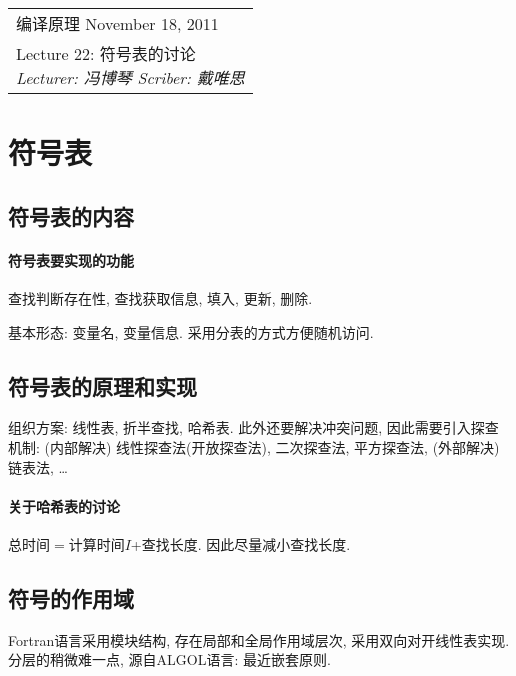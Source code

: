\def\lecture{22}
\clearpage \noindent\begin{tabularx}{\linewidth}{|X|}
\hline \vskip -2mm
{\sf 编译原理} \hfill November 18, 2011 \\
{\centering \sf \large Lecture \lecture:
符号表的讨论 \\ }
\textsl{Lecturer: 冯博琴 \hfill Scriber: 戴唯思}\\ \hline
\end{tabularx}
\setcounter{section}{0}
\renewcommand{\thepage}{\lecture -\arabic{page}}

\section{符号表}

    \subsection{符号表的内容}

        \paragraph{符号表要实现的功能} 查找判断存在性, 查找获取信息, 填入, 更新, 删除.

        基本形态: 变量名, 变量信息. 采用分表的方式方便随机访问.

    \subsection{符号表的原理和实现}

        组织方案: 线性表, 折半查找, 哈希表. 此外还要解决冲突问题, 因此需要引入探查机制: (内部解决) 线性探查法(开放探查法), 二次探查法, 平方探查法, (外部解决) 链表法, \ldots

        \paragraph{关于哈希表的讨论}

            总时间$=$计算时间$I$+查找长度. 因此尽量减小查找长度.

    \subsection{符号的作用域}

        Fortran语言采用模块结构, 存在局部和全局作用域层次, 采用双向对开线性表实现. 分层的稍微难一点, 源自ALGOL语言: \textsf{最近嵌套原则}.
